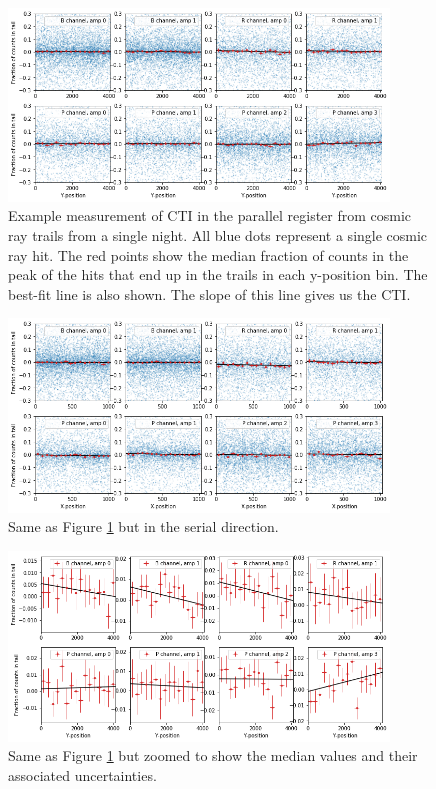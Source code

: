 \begin{figure}
    \centering
    \includegraphics[width=0.9\textwidth]{figures/cte/single_night_example_parallel.png}
    \caption{Example measurement of CTI in the parallel register from cosmic ray trails from a single night. All blue dots represent a single cosmic ray hit. The red points show the median fraction of counts in the peak of the hits that end up in the trails in each y-position bin. The best-fit line is also shown. The slope of this line gives us the CTI.}
    \label{fig:cte_single_night}
\end{figure}

\begin{figure}
    \centering
    \includegraphics[width=0.9\textwidth]{figures/cte/single_night_example_serial.png}
    \caption{Same as Figure \ref{fig:cte_single_night} but in the serial direction.}
    \label{fig:cte_single_night_serial}
\end{figure}

\begin{figure}
    \centering
    \includegraphics[width=0.9\textwidth]{figures/cte/single_night_example_parallel_medians.png}
    \caption{Same as Figure \ref{fig:cte_single_night} but zoomed to show the median values and their associated uncertainties.}
    \label{fig:cte_single_night_medians}
\end{figure}

